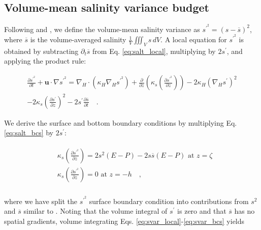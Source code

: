 \documentclass[draft]{agujournal2019}
\begin{document}
\subsection{Volume-mean salinity variance budget}

Following  and , we define the volume-mean salinity variance as $s^{\prime^2} = (s-\overline{s})^2$, where $\overline{s}$ is the volume-averaged salinity $\frac{1}{V} \iiint_V s \, dV$. A local equation for $s^{\prime^2}$ is obtained by subtracting $\partial_t \overline{s}$ from Eq. \ref{eq:salt_local}, multiplying by $2s^{\prime}$, and applying the product rule:
\begin{linenomath*}
\begin{equation} \label{eq:svar_local}
    \begin{split}
    \frac{\partial s^{\prime^2}}{\partial t} + \textbf{u} \cdot \nabla s^{\prime^2} = \nabla_H \cdot (\kappa_H \nabla_H s^{\prime^2})+ \frac{\partial}{\partial z} \left(\kappa_s \left(\frac{\partial s^{\prime^2}}{\partial z} \right) \right) -2\kappa_H(\nabla_H s^\prime)^2\\
     -2\kappa_s \left(\frac{\partial s^\prime}{\partial z} \right)^2 - 2s^{\prime} \frac{\partial \overline{s}}{\partial t} \quad .
    \end{split}
\end{equation}
\end{linenomath*}
We derive the surface and bottom boundary conditions by multiplying Eq. \ref{eq:salt_bcs} by $2s^{\prime}$:
\begin{linenomath*}
\begin{align} \label{eq:svar_bcs}
    \begin{split}
         & \kappa_s \left({\frac{\partial s^{\prime^2}}{\partial z}} \right) = 2s^2(E-P) -2s \overline{s}(E-P) \,\, \textrm{at} \,\, z = \zeta \\
         & \kappa_s \left({\frac{\partial s^{\prime^2}}{\partial z}} \right) = 0 \,\, \textrm{at} \,\, z = -h \quad ,\\
    \end{split}
\end{align}
\end{linenomath*}
where we have split the $s^{\prime^2}$ surface boundary condition into contributions from $s^2$ and $\overline{s}$ similar to . 
Noting that the volume integral of $s^\prime$ is zero and that $\overline{s}$ has no spatial gradients, volume integrating Eqs. \ref{eq:svar_local}-\ref{eq:svar_bcs} yields
\end{document}
